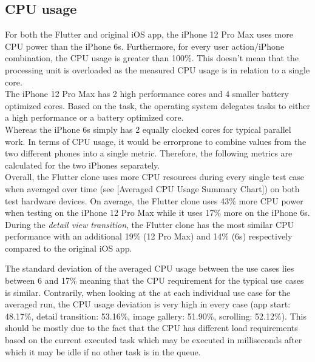 \subsection{CPU usage} \label{section::cpu_usage}
For both the Flutter and original iOS app, the iPhone 12 Pro Max uses more CPU power than the iPhone 6s. Furthermore, for every user action/iPhone combination, the 
CPU usage is greater than 100\%. This doesn't mean that the processing unit is overloaded as the measured CPU usage is in relation to a single core.\\
The iPhone 12 Pro Max has 2 high performance cores and 4 smaller battery optimized cores. Based on the task, the operating system delegates tasks to either a high performance or a 
battery optimized core.\\
Whereas the iPhone 6s simply has 2 equally clocked cores for typical parallel work.
In terms of CPU usage, it would be errorprone to combine values from the two different phones into a single metric. Therefore, the following metrics are calculated for the two iPhones separately.\\
Overall, the Flutter clone uses more CPU resources during every single test case when averaged over time (see [Averaged CPU Usage Summary Chart]) on both test hardware devices.
On average, the Flutter clone uses 43\% more CPU power when testing on the iPhone 12 Pro Max while it uses 17\% more on the iPhone 6s.\\
During the \textit{detail view transition}, the Flutter clone has the most similar CPU performance with an additional 19\% (12 Pro Max) and 14\% (6s) respectively compared to the original iOS app.

The standard deviation of the averaged CPU usage between the use cases lies between 6 and 17\% meaning that the CPU requirement for the typical use cases is similar.
Contrarily, when looking at the at each individual use case for the averaged run, the CPU usage deviation is very high in every case (app start: 48.17\%, detail transition: 53.16\%, image gallery: 51.90\%, scrolling: 52.12\%).
This should be mostly due to the fact that the CPU has different load requirements based on the current executed task which may be executed in milliseconds after which it may be idle if no other task is in the queue.




